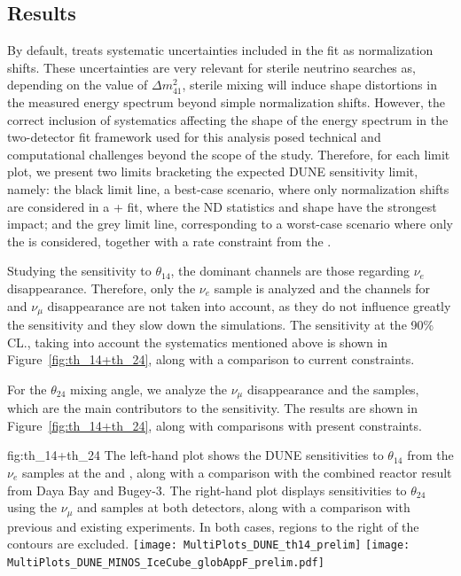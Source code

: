 \subsection{Results}
By default,  treats systematic uncertainties included in the fit as normalization shifts. These uncertainties are very relevant for sterile neutrino searches as, depending on the value of $\Delta m^2_{41}$, sterile mixing will induce shape distortions in the measured energy spectrum beyond simple normalization shifts. However, the correct inclusion of systematics affecting the shape of the energy spectrum in the two-detector fit  framework used for this analysis posed technical and computational challenges beyond the scope of the study.
Therefore, for each limit plot, we present two limits bracketing the expected DUNE sensitivity limit, namely: the black limit line, a best-case scenario, where only normalization shifts are considered in a + fit, where the ND statistics and shape have the strongest impact; and the grey limit line, corresponding to a worst-case scenario where only the  is considered, together with a rate constraint from the . 

Studying the sensitivity to $\theta_{14}$, the dominant channels are those regarding $\nu_e$ disappearance. Therefore, only the $\nu_e$  sample is analyzed and the channels for  and $\nu_{\mu}$  disappearance are not taken into account, as they do not influence greatly the sensitivity and they slow down the simulations. The sensitivity at the 90\% CL., taking into account the systematics mentioned above is shown in Figure~\ref{fig:th_14+th_24}, along with a comparison to current constraints.

For the $\theta_{24}$ mixing angle, we analyze the $\nu_{\mu}$  disappearance and the  samples, which are the main contributors to the sensitivity. 
The results are shown in Figure~\ref{fig:th_14+th_24}, along with comparisons with present constraints.

\begin{dunefigure} %
{fig:th_14+th_24}
{The left-hand plot shows the DUNE sensitivities to $\theta_{14}$ from the $\nu_e$  samples at the  and , along with a comparison with the combined reactor result from Daya Bay and Bugey-3. The right-hand plot displays sensitivities to $\theta_{24}$ using the $\nu_\mu$  and  samples at both detectors, along with a comparison with previous and existing experiments. In both cases, regions to the right of the contours are excluded.}
\texttt{[image: MultiPlots\_DUNE\_th14\_prelim]}
\texttt{[image: MultiPlots\_DUNE\_MINOS\_IceCube\_globAppF\_prelim.pdf]}
\end{dunefigure}

